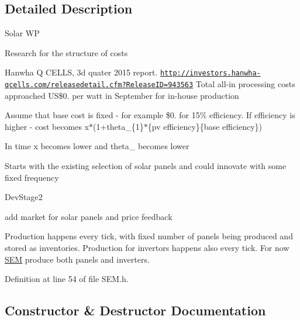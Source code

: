 \subsection{Detailed Description}
\begin{DoxyRefDesc}{Solar W\+P}
\item[\hyperlink{wp__wp000005}{Solar W\+P}]Research for the structure of costs\end{DoxyRefDesc}


Hanwha Q C\+E\+L\+L\+S, 3d quater 2015 report. \href{http://investors.hanwha-qcells.com/releasedetail.cfm?ReleaseID=943563}{\tt http\+://investors.\+hanwha-\/qcells.\+com/releasedetail.\+cfm?\+Release\+I\+D=943563} Total all-\/in processing costs approached U\+S\$0. per watt in September for in-\/house production

Assume that base cost is fixed -\/ for example \$0. for 15\% efficiency. If efficiency is higher -\/ cost becomes x$\ast$(1+theta\+\_\+\{1\}$\ast$\{pv efficiency\}\{base efficiency\})

In time x becomes lower and theta\+\_ becomes lower

Starts with the existing selection of solar panels and could innovate with some fixed frequency

\begin{DoxyRefDesc}{Dev\+Stage2}
\item[\hyperlink{_dev_stage2__DevStage2000023}{Dev\+Stage2}]add market for solar panels and price feedback \end{DoxyRefDesc}


Production happens every tick, with fixed number of panels being produced and stored as inventories. Production for invertors happens also every tick. For now \hyperlink{classsolar__core_1_1_s_e_m}{S\+E\+M} produce both panels and inverters. 

Definition at line 54 of file S\+E\+M.\+h.



\subsection{Constructor \& Destructor Documentation}
\hypertarget{classsolar__core_1_1_s_e_m_a60d13fcadec26853d8461d32eefb97da}{}
